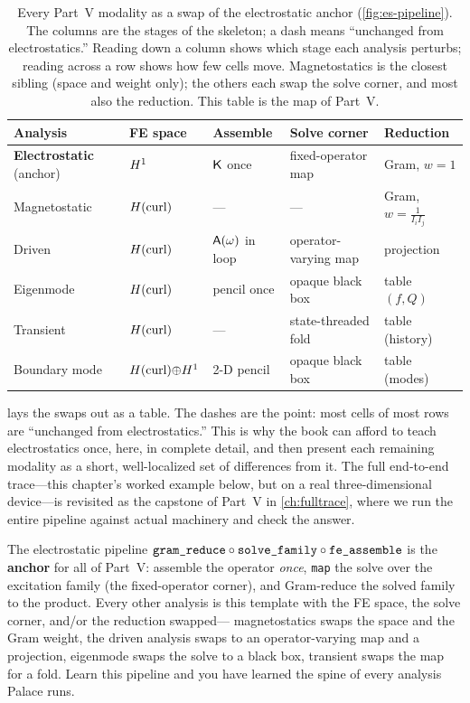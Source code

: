 \begin{table}[t]
\centering
\caption[The modalities as swaps of the anchor]{Every Part~V modality as a swap of
the electrostatic anchor (\cref{fig:es-pipeline}). The columns are the stages of the
skeleton; a dash means ``unchanged from electrostatics.'' Reading down a column shows
which stage each analysis perturbs; reading across a row shows how few cells move.
Magnetostatics is the closest sibling (space and weight only); the others each swap
the solve corner, and most also the reduction. This table is the map of Part~V.}
\label{tab:es-swaps}
\small
\setlength{\tabcolsep}{4.5pt}
\renewcommand{\arraystretch}{1.3}
\begin{tabular}{@{}lllll@{}}
\toprule
Analysis & FE space & Assemble & Solve corner & Reduction \\
\midrule
\textbf{Electrostatic} (anchor) & $H^1$ & $\mathsf{K}$ once & fixed-operator map & Gram, $w{=}1$ \\
Magnetostatic & $H(\mathrm{curl})$ & --- & --- & Gram, $w{=}\tfrac{1}{I_iI_j}$ \\
Driven & $H(\mathrm{curl})$ & $\mathsf{A}(\omega)$ in loop & operator-varying map & projection \\
Eigenmode & $H(\mathrm{curl})$ & pencil once & opaque black box & table $(f,Q)$ \\
Transient & $H(\mathrm{curl})$ & --- & state-threaded fold & table (history) \\
Boundary mode & $H(\mathrm{curl}){\oplus}H^1$ & 2-D pencil & opaque black box & table (modes) \\
\bottomrule
\end{tabular}
\end{table}

 lays the swaps out as a table. The dashes are the point: most
cells of most rows are ``unchanged from electrostatics.'' This is why the book can
afford to teach electrostatics once, here, in complete detail, and then present
each remaining modality as a short, well-localized set of differences from it. The
full end-to-end trace---this chapter's worked example below, but on a real
three-dimensional device---is revisited as the capstone of Part~V in
\cref{ch:fulltrace}, where we run the entire pipeline against actual machinery and
check the answer.

\begin{keyidea}
The electrostatic pipeline $\texttt{gram\_reduce}\circ\texttt{solve\_family}\circ
\texttt{fe\_assemble}$ is the \textbf{anchor} for all of Part~V: assemble the operator
\emph{once}, \texttt{map} the solve over the excitation family (the fixed-operator
corner), and Gram-reduce the solved family to the product. Every other analysis is
this template with the FE space, the solve corner, and/or the reduction swapped---
magnetostatics swaps the space and the Gram weight, the driven analysis swaps to an
operator-varying map and a projection, eigenmode swaps the solve to a black box,
transient swaps the map for a fold. Learn this pipeline and you have learned the
spine of every analysis Palace runs.
\end{keyidea}

